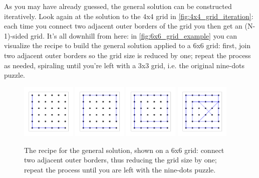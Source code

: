 \documentclass[11pt]{article}
\begin{document}
As you may have already guessed, the general solution can be constructed iteratively. Look again at the solution to the 4x4 grid in \autoref{fig:4x4_grid_iteration}: each time you connect two adjacent outer borders of the grid you then get an (N-1)-sided grid. It's all downhill from here: in \autoref{fig:6x6_grid_example} you can visualize the recipe to build the general solution applied to a 6x6 grid: first, join two adjacent outer borders so the grid size is reduced by one; repeat the process as needed, spiraling until you're left with a 3x3 grid, i.e. the original nine-dots puzzle.
\begin{figure}[H]
\centering
\includegraphics[width=0.23\textwidth]{images/6x6_grid_iteration_01.png}
\includegraphics[width=0.23\textwidth]{images/6x6_grid_iteration_02.png}
\includegraphics[width=0.23\textwidth]{images/6x6_grid_iteration_03.png}
\includegraphics[width=0.23\textwidth]{images/6x6_grid_solution.png}
\caption{The recipe for the general solution, shown on a 6x6 grid: connect two adjacent outer borders, thus reducing the grid size by one; repeat the process until you are left with the nine-dots puzzle.}
\label{fig:6x6_grid_example}
\end{figure}
\end{document}
